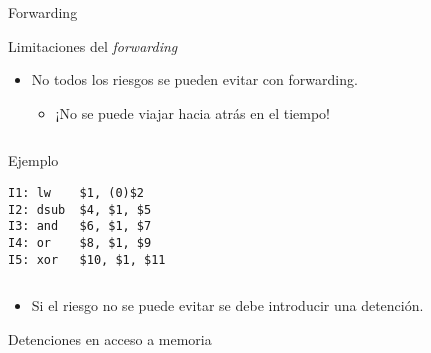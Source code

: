 \begin{frame}[t]{Forwarding}
\makebox[\textwidth][c]{

}
\end{frame}

\begin{frame}[t,fragile]{Limitaciones del \emph{forwarding}}
\begin{itemize}
  \item No todos los riesgos se pueden evitar con forwarding.
    \begin{itemize}
      \item ¡No se puede viajar hacia atrás en el tiempo!
    \end{itemize}
\end{itemize}

\begin{columns}

\begin{column}{.4\textwidth}
\begin{block}{Ejemplo}
\begin{lstlisting}[language={generalasm}]
I1: lw    $1, (0)$2
I2: dsub  $4, $1, $5 
I3: and   $6, $1, $7  
I4: or    $8, $1, $9 
I5: xor   $10, $1, $11
\end{lstlisting}
\end{block}
\end{column}

\begin{column}{.6\textwidth}
\makebox[\textwidth][c]{

}\end{column}

\end{columns}
\begin{itemize}
  \item Si el riesgo no se puede evitar se debe introducir una detención.
\end{itemize}

\end{frame}

\begin{frame}[t]{Detenciones en acceso a memoria}
\makebox[\textwidth][c]{

}
\end{frame}
